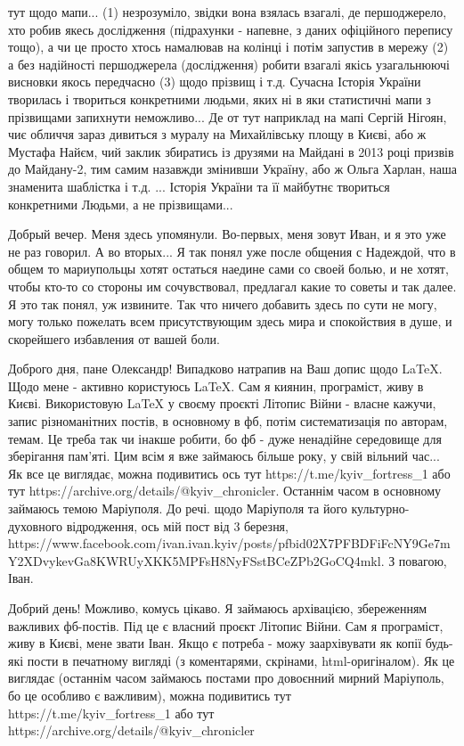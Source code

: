 тут щодо мапи... (1) незрозуміло, звідки вона взялась взагалі, де першоджерело,
хто робив якесь дослідження (підрахунки - напевне, з даних офіційного перепису
тощо), а чи це просто хтось намалював на колінці і потім запустив в мережу (2)
а без надійності першоджерела (дослідження) робити взагалі якісь узагальнюючі
висновки якось передчасно (3) щодо прізвищ і т.д. Сучасна Історія України
творилась і твориться конкретними людьми, яких ні в яки статистичні мапи з
прізвищами запихнути неможливо... Де от тут наприклад на мапі Сергій Нігоян,
чиє обличчя зараз дивиться з муралу на Михайлівську площу в Києві, або ж
Мустафа Найєм, чий заклик збиратись із друзями на Майдані в 2013 році призвів
до Майдану-2, тим самим назавжди змінивши Україну, або ж Ольга Харлан, наша
знаменита шаблістка і т.д. ... Історія України та її майбутнє твориться
конкретними Людьми, а не прізвищами...

Добрый вечер. Меня здесь упомянули. Во-первых, меня зовут Иван, и я это уже не
раз говорил. А во вторых... Я так понял уже после общения с Надеждой, что в
общем то мариупольцы хотят остаться наедине сами со своей болью, и не хотят,
чтобы кто-то со стороны им сочувствовал, предлагал какие то советы и так далее.
Я это так понял, уж извините. Так что ничего добавить здесь по сути не могу,
могу только пожелать всем присутствующим здесь мира и спокойствия в душе, и
скорейшего избавления от вашей боли.


Доброго дня, пане Олександр! Випадково натрапив на Ваш допис щодо LaTeX. Щодо
мене - активно користуюсь LaTeX. Сам я киянин, програміст, живу в Києві.
Використовую LaTeX у своєму проєкті Літопис Війни - власне кажучи, запис
різноманітних постів, в основному в фб, потім систематизація по авторам, темам.
Це треба так чи інакше робити, бо фб - дуже ненадійне середовище для зберігання
пам'яті. Цим всім я вже займаюсь більше року, у свій вільний час... Як все це
виглядає, можна подивитись ось тут https://t.me/kyiv_fortress_1 або тут
https://archive.org/details/@kyiv_chronicler. Останнім часом в основному
займаюсь темою Маріуполя. До речі. щодо Маріуполя та його культурно-духовного
відродження, ось мій пост від 3 березня,
https://www.facebook.com/ivan.ivan.kyiv/posts/pfbid02X7PFBDFiFcNY9Ge7mY2XDvykevGa8KWRUyXKK5MPFsH8NyFSstBCeZPb2GoCQ4mkl.
З повагою, Іван.

Добрий день! Можливо, комусь цікаво. Я займаюсь архівацією, збереженням важливих
фб-постів. Під це є власний проєкт Літопис Війни. Сам я програміст, живу в
Києві, мене звати Іван. Якщо є потреба - можу заархівувати як копії будь-які
пости в печатному вигляді (з коментарями, скрінами, html-оригіналом). Як це
виглядає (останнім часом займаюсь постами про довоєнний мирний Маріуполь, бо це
особливо є важливим), можна подивитись  тут  https://t.me/kyiv_fortress_1 або
тут https://archive.org/details/@kyiv_chronicler

